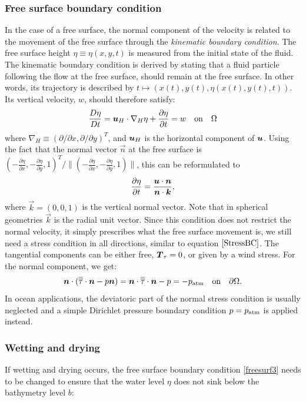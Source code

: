 \subsubsection{Free surface boundary condition}\label{sec:FS}
In the case of a free surface, the normal component of the velocity is related
to the movement of the free surface through the \emph{kinematic boundary
condition}. The free surface height $\eta\equiv\eta(x,y,t)$ is measured from 
the initial state of the fluid. The kinematic boundary condition is derived by
stating that a fluid particle following the flow at the free surface, should
remain at the free surface. In other words, its trajectory is described by
$t\mapsto (x(t), y(t),\eta(x(t),y(t),t))$. Its vertical velocity, $w$, should
therefore satisfy:
\begin{equation*}
  \frac{D\eta}{Dt}={\mbox{\boldmath$u$}}_H \cdot\nabla_H \eta +
  \frac{\partial\eta}{\partial t} = w \quad \textrm{on}\quad \Omega
\end{equation*}
where $\nabla_H\equiv(\partial/\partial x,\partial/\partial y)^T$, and
${\mbox{\boldmath$u$}}_H$ is the horizontal component of ${\mbox{\boldmath$u$}}$.
Using the fact that the normal vector $\vec n$ at the free surface is
$(-\frac{\partial \eta}{\partial x},-\frac{\partial \eta}{\partial y}, 1)^T/
\|(-\frac{\partial \eta}{\partial x},-\frac{\partial \eta}{\partial y}, 1)\|$,
this can be reformulated to
\begin{equation}\label{freesurf3}
\frac{\partial \eta}{\partial t}=\frac{{\mbox{\boldmath$u$}} \cdot {\mbox{\boldmath$n$}}}{{\mbox{\boldmath$n$}} \cdot {\mbox{\boldmath$k$}}},
\end{equation}
where $\vec k=(0,0,1)$ is the vertical normal vector. Note that in spherical
geometries $\vec k$ is the radial unit vector. Since this condition does not
restrict the normal velocity, it simply
prescribes what the free surface movement is, we still need a stress condition
in all directions, similar to equation $\eqref{StressBC}$. The tangential
components can be either free, ${\mbox{\boldmath$T$}}_\tau=0$, or given by a wind stress. For the
normal component, we get:
\begin{equation}
  {\mbox{\boldmath$n$}}\cdot(\overline{\overline{\tau}}\cdot{\mbox{\boldmath$n$}} - p{\mbox{\boldmath$n$}}) = {\mbox{\boldmath$n$}}\cdot\overline{\overline{\tau}}\cdot{\mbox{\boldmath$n$}} - p =
  -p_{\text{atm}} \quad \textrm{on}\quad \partial\Omega.
  \label{NormalStressBC}
\end{equation}
In ocean applications, the deviatoric part of the normal stress condition is
usually neglected and a simple Dirichlet pressure boundary condition $p=p_{\text{atm}}$
is applied instead.

\subsubsection{Wetting and drying}\label{sec:WD}
If wetting and drying occurs, the free surface boundary condition \ref{freesurf3} needs to be changed to ensure that the water level $\eta$ does not sink below the bathymetry level $b$:

